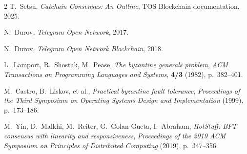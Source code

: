 \documentclass[12pt,oneside]{article}
\def\markbothsame#1{\fancyhead[C]{#1}}
\begin{document}
\clearpage

%
%
%

\clearpage
\markbothsame{\textsc{References}}

\begin{thebibliography}{2}
  {\sc T.~Setsu}, {\sl Catchain Consensus: An Outline}, TOS Blockchain documentation, 2025.

  {\sc N.~Durov}, {\sl Telegram Open Network}, 2017.

  {\sc N.~Durov}, {\sl Telegram Open Network Blockchain}, 2018.

  {\sc L.~Lamport, R.~Shostak, M.~Pease}, {\sl The byzantine generals problem}, {\it ACM Transactions on Programming Languages and Systems}, {\bf 4/3} (1982), p.~382--401.

  {\sc M.~Castro, B.~Liskov, et al.}, {\sl Practical byzantine fault tolerance}, {\it Proceedings of the Third Symposium on Operating Systems Design and Implementation\/} (1999), p.~173--186.

  {\sc M.~Yin, D.~Malkhi, M.~Reiter, G.~Golan-Gueta, I.~Abraham}, {\sl HotStuff: BFT consensus with linearity and responsiveness}, {\it Proceedings of the 2019 ACM Symposium on Principles of Distributed Computing\/} (2019), p.~347--356.

\end{thebibliography}
\end{document}
